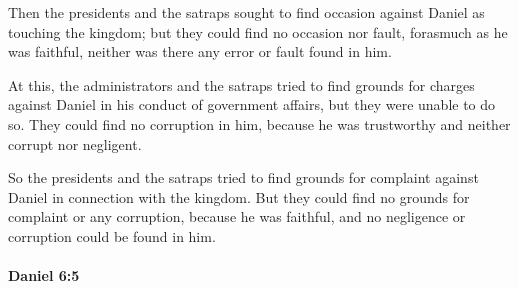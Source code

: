 			\begin{versebox}
					\item[BHS] 
					\item[LXX] 
					\item[ASV] Then the presidents and the satraps sought to find occasion against Daniel as touching the kingdom; but they could find no occasion nor fault, forasmuch as he was faithful, neither was there any error or fault found in him.
					\item[NIV] At this, the administrators and the satraps tried to find grounds for charges against Daniel in his conduct of government affairs, but they were unable to do so. They could find no corruption in him, because he was trustworthy and neither corrupt nor negligent.
					\item[NRSV] So the presidents and the satraps tried to find grounds for complaint against Daniel in connection with the kingdom. But they could find no grounds for complaint or any corruption, because he was faithful, and no negligence or corruption could be found in him.
			\end{versebox}

		\paragraph{Daniel 6:5} %
			\label{DANIEL-6-5}

